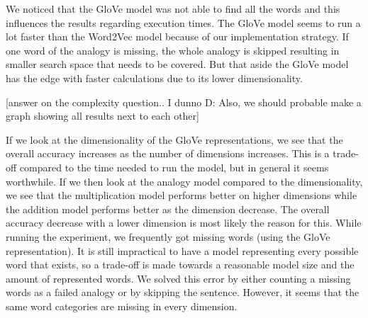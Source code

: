 We noticed that the GloVe model was not able to find all the words and this influences the results regarding execution times. The GloVe model seems to run a lot faster than the Word2Vec model because of our implementation strategy. If one word of the analogy is missing, the whole analogy is skipped resulting in smaller search space that needs to be covered. But that aside the GloVe model has the edge with faster calculations due to its lower dimensionality.
\newline

[answer on the complexity question.. I dunno D:
Also, we should probable make a graph showing all results next to each other]
\newline

If we look at the dimensionality of the GloVe representations, we see that the overall accuracy increases as the number of dimensions increases. This is a trade-off compared to the time needed to run the model, but in general it seems worthwhile. 
If we then look at the analogy model compared to the dimensionality, we see that the multiplication model performs better on higher dimensions while the addition model performs better as the dimension decrease. The overall accuracy decrease with a lower dimension is most likely the reason for this.
\newline
While running the experiment, we frequently got missing words (using the GloVe representation). It is still impractical to have a model representing every possible word that exists, so a trade-off is made towards a reasonable model size and the amount of represented words. We solved this error by either counting a missing words as a failed analogy or by skipping the sentence. However, it seems that the same word categories are missing in every dimension.

